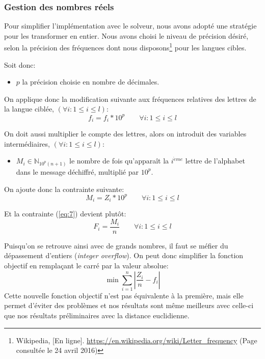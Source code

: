 \documentclass[11pt]{article}
\begin{document}
			\subsubsection{Gestion des nombres réels}

				Pour simplifier l'implémentation avec le solveur, nous avons adopté une stratégie pour les transformer en entier.
				Nous avons choisi le niveau de précision désiré, selon la précision des fréquences dont nous disposons\footnote{Wikipedia, [En ligne]. \url{https://en.wikipedia.org/wiki/Letter_frequency} (Page consultée le 24 avril 2016)} pour les langues cibles.

				Soit donc:
				\begin{itemize}
					\item $p$ la précision choisie en nombre de décimales.
				\end{itemize}

				\bigskip

				On applique donc la modification suivante aux fréquences relatives des lettres de la langue ciblée, $(\forall i : 1 \leq i \leq l)$:
				\begin{equation} \label{eq:11}
					f_i = f_i * 10^p \qquad \forall i : 1 \leq i \leq l
				\end{equation}

				On doit aussi multiplier le compte des lettres, alors on introduit des variables intermédiaires, $(\forall i : 1 \leq i \leq l)$:
				\begin{itemize}
					\item $M_i \in \mathbb{N}_{10^p(n+1)}$ le nombre de fois qu'apparaît la $i^{\grave{e}me}$ lettre de l'alphabet dans le message déchiffré, multiplié par $10^p$.
				\end{itemize}

				\bigskip

				On ajoute donc la contrainte suivante:
				\begin{equation} \label{eq:12}
					M_i = Z_i * 10^p \qquad \forall i : 1 \leq i \leq l
				\end{equation}

				Et la contrainte (\ref{eq:7}) devient plutôt:
				\begin{equation} \label{eq:13}
					F_i = \frac{M_i}{n} \qquad \forall i : 1 \leq i \leq l
				\end{equation}

				Puisqu'on se retrouve ainsi avec de grands nombres, il faut se méfier du dépassement d'entiers (\emph{integer overflow}). On peut donc simplifier la fonction objectif en remplaçant le carré par la valeur absolue:
				\begin{equation} \label{eq:14}
					\min \sum\limits_{i=1}^n |\frac{Z_i}{n} - f_i|
				\end{equation}
				Cette nouvelle fonction objectif n'est pas équivalente à la première, mais elle permet d'éviter des problèmes et nos résultats sont même meilleurs avec celle-ci que nos résultats préliminaires avec la distance euclidienne.
\end{document}
